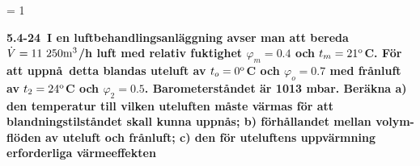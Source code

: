 

\pageno = 1

\noindent \bf 5.4-24\rm ~I en luftbehandlingsanl\"aggning avser man
att bereda $\dot{V}=11\ 250\rm{m}^3$/h luft med relativ
fuktighet $\varphi_{m}=0.4$ och $t_{m}=21^{\rm{o}}$C. F\"or
att uppn\aa\ detta blandas uteluft av $t_{o}=0^{\rm{o}}$C och
$\varphi_{o}=0.7$ med fr\aa nluft av $t_{2}=24^{\rm{o}}$C och
$\varphi_{2}=0.5$. Barometerst\aa ndet \"ar 1013 mbar.
Ber\"akna a) den temperatur till vilken
uteluften m\aa ste v\"armas f\"or att blandningstilst\aa ndet
skall kunna uppn\aa s; b) f\"orh\aa llandet
mellan volym-\hfill\break fl\"oden av uteluft och fr\aa nluft;
c) den f\"or uteluftens uppv\"armning erforderliga
v\"armeeffekten

\medskip





